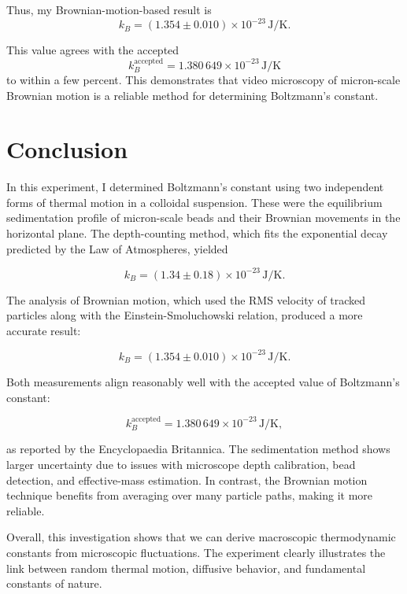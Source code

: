 \documentclass[%
 reprint,
 amsmath,amssymb,
 aps,
]{revtex4-2}
\begin{document}
Thus, my Brownian-motion-based result is
\[
    k_B = (1.354 \pm 0.010)\times10^{-23}\,\mathrm{J/K}.
\]

This value agrees with the accepted
\[
    k_B^\mathrm{accepted} = 1.380\,649\times10^{-23}\,\mathrm{J/K}
\]
to within a few percent. This demonstrates that video microscopy of micron-scale Brownian motion is a reliable method for determining Boltzmann’s constant.

\section*{Conclusion}

In this experiment, I determined Boltzmann's constant using two independent forms of thermal motion in a colloidal suspension. These were the equilibrium sedimentation profile of micron-scale beads and their Brownian movements in the horizontal plane. The depth-counting method, which fits the exponential decay predicted by the Law of Atmospheres, yielded 

\[
k_B = (1.34 \pm 0.18) \times 10^{-23}\,\mathrm{J/K}.
\]

The analysis of Brownian motion, which used the RMS velocity of tracked particles along with the Einstein-Smoluchowski relation, produced a more accurate result:

\[
k_B = (1.354 \pm 0.010) \times 10^{-23}\,\mathrm{J/K}.
\]

Both measurements align reasonably well with the accepted value of Boltzmann's constant:

\[
k_B^\mathrm{accepted} = 1.380\,649 \times 10^{-23}\,\mathrm{J/K},
\]

as reported by the Encyclopaedia Britannica. \cite{BritannicaBoltzmann} The sedimentation method shows larger uncertainty due to issues with microscope depth calibration, bead detection, and effective-mass estimation. In contrast, the Brownian motion technique benefits from averaging over many particle paths, making it more reliable.

Overall, this investigation shows that we can derive macroscopic thermodynamic constants from microscopic fluctuations. The experiment clearly illustrates the link between random thermal motion, diffusive behavior, and fundamental constants of nature.



\end{document}

